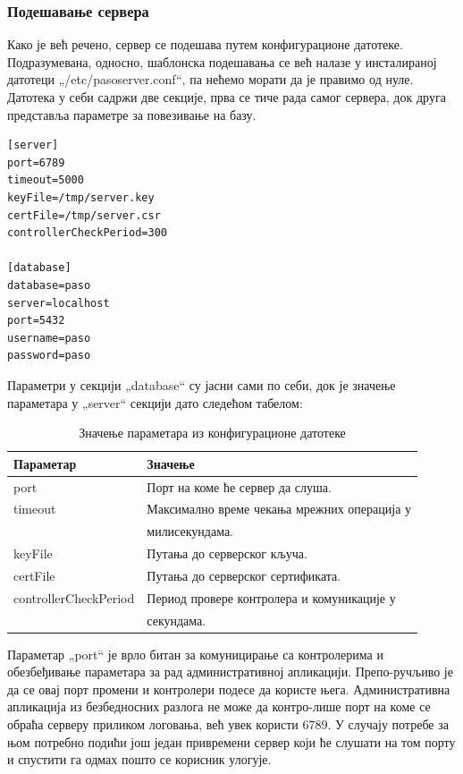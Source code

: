 \documentclass[a4paper, 12pt, diplomski]{etfcyr}
\def\quote#1{„#1“}
\begin{document}
					\subsubsection*{Подешавање сервера}
						\begin{justify}
							Како је већ речено, сервер се подешава путем конфигурационе датотеке. Подразумевана, односно, шаблонска подешавања се већ налазе у инсталираној датотеци \quote{/etc/pasoserver.conf}, па нећемо морати да је правимо од нуле.
							Датотека у себи садржи две секције, прва се тиче рада самог сервера, док друга представља параметре за повезивање на базу.
							\begin{lstlisting}[caption=Шаблон датотеке за подешавање сервера]
[server]
port=6789
timeout=5000
keyFile=/tmp/server.key
certFile=/tmp/server.csr
controllerCheckPeriod=300

[database]
database=paso
server=localhost
port=5432
username=paso
password=paso
							\end{lstlisting}

							Параметри у секцији \quote{database} су јасни сами по себи, док је значење параметара у \quote{server} секцији дато следећом табелом:
							\begin{table}[H]
								\begin{tabular}{l l}
									Параметар & Значење \\
									\hline
									port & Порт на коме ће сервер да слуша. \\
									timeout & Максимално време чекања мрежних операција у \\
									& милисекундама. \\
									keyFile & Путања до серверског кључа. \\
									certFile & Путања до серверског сертификата. \\
									controllerCheckPeriod & Период провере контролера и комуникације у \\
									& секундама. \\
									\hline
								\end{tabular}
								\caption{Значење параметара из конфигурационе датотеке}
								\label{table:config_file_params}
							\end{table}
							Параметар \quote{port} је врло битан за комуницирање са контролерима и обезбеђивање параметара за рад административној апликацији. Препо-ручљиво је да се овај порт промени и контролери подесе да користе њега. Административна апликација из безбедносних разлога не може да контро-лише порт на коме се обраћа серверу приликом логовања, већ увек користи 6789. У случају потребе за њом потребно подићи још један привремени сервер који ће слушати на том порту и спустити га одмах пошто се корисник улогује.


\end{justify}
\end{document}
